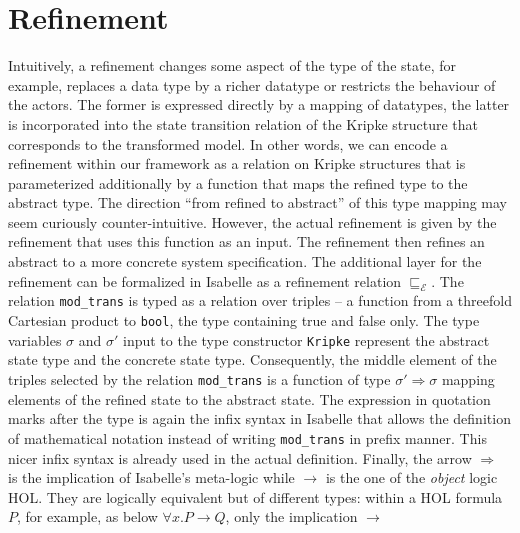 \documentclass{llncs}
\newcommand\ttimp{\mbox{{$\longrightarrow$}}}
\newcommand\ttImp{\mbox{{$\Longrightarrow$}}}
\begin{document}
\section{Refinement}
\label{sec:ref}
Intuitively, a refinement changes some aspect of the type of
the state, for example, replaces a data type by a richer datatype or
restricts the behaviour of the actors. The former is expressed directly 
by a mapping of datatypes, the latter is incorporated into the state
transition relation of the Kripke structure that corresponds to the 
transformed model.
In other words, we can encode a refinement within our framework
as a relation on Kripke structures that is parameterized additionally by
a function that maps the refined type to the abstract type.
The direction ``from refined to abstract'' of this type mapping may seem 
curiously counter-intuitive. However, the actual refinement is given by the 
refinement that uses this function as an input. The refinement
then refines an abstract to a more concrete system specification. 
The additional layer for the refinement 
can be formalized in Isabelle as a
refinement relation 
$\sqsubseteq_{\mathcal{E}}$. 
The relation \texttt{mod\_trans} is typed as a relation over triples --
a function from a threefold Cartesian product to \texttt{bool}, the 
type containing true and false only.  
The type variables $\sigma$ and $\sigma'$ input to the type constructor 
\texttt{Kripke} represent the abstract state type and the concrete state type. 
Consequently, the middle element of the triples selected by the relation 
\texttt{mod\_trans} is a function of type $\sigma' \Rightarrow \sigma$ 
mapping elements of the refined state to the abstract state.
The expression in quotation marks after the type is again the
infix syntax in Isabelle that allows the definition of mathematical notation
instead of writing \texttt{mod\_trans} in prefix manner. This nicer infix
syntax is already used in the actual definition.
Finally, the arrow \texttt{\ttImp} is the implication of Isabelle's  meta-logic
while $\ttimp$ is the one of the {\it object} logic HOL. 
They are logically equivalent but of different
types: within a HOL formula $P$, for example, as below $\forall x. P \ttimp Q$, only the implication $\ttimp$
\end{document}

